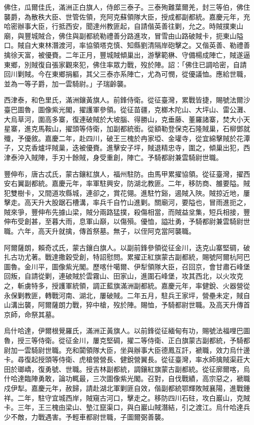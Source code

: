 \begin{pinyinscope}
佛住，瓜爾佳氏，滿洲正白旗人，侍郎三泰子。三泰殉難葉爾羌，封三等伯，佛住襲爵，為散秩大臣、世管佐領，充阿克蘇領隊大臣，授成都副都統。嘉慶元年，充哈密辦事大臣，行抵西安，聞達州教匪起，自請偕英善往剿，允之。時賊撲東山廟，與豐城賊合，佛住與副都統勒禮善分路進攻，冒雪由山路破賊卡，扼東山隘口。賊自大東林潛渡河，率協領塔克慎、知縣劉清隔岸砲擊之。又偕英善、勒禮善擒徐天富，被優賚。二年正月，豐城賊傾巢出，游擊範楙、守備楊成陣亡，賊遂逼東鄉，別賊復自張家觀來犯，佛住率眾力戰，歿於陣。詔：「佛住已調哈密，自請回川剿賊。今在東鄉捐軀，其父三泰亦系陣亡，尤為可憫，從優議恤。應給世職，並為一等子爵，加一雲騎尉。」子瑞齡襲。

西津泰，和色里氏，滿洲鑲黃旗人。前鋒侍衛。從征臺灣，累戰皆捷，賜號法爾沙臺巴圖魯，圖像紫光閣，擢護軍參領。從征苗疆，克榔木陀山、大坪山、雷公灘、大烏草河，圍高多寨，復連破賊於大坡腦、得勝山，克垂藤、董羅諸寨，焚大小天星寨，進克馬鞍山，擢頭等侍衛，加副都統銜。從額勒登保克石隆賊巢，石柳鄧就殲，予優敘。嘉慶二年，赴四川，破王三槐於冉家埡、金瓘寺，從宜綿擊賊於花潭子，又克香爐坪賊巢，迭被優賚。進擊安子坪，賊退精忠寺，圍之，傾巢出犯，西津泰沖入賊陣，手刃十餘賊，身受重創，陣亡。予騎都尉兼雲騎尉世職。

豐伸布，唐古忒氏，蒙古鑲紅旗人，福州駐防。由馬甲累擢協領。從征臺灣，擢西安右翼副都統。嘉慶元年，率軍駐興安，防湖北教匪。二年，移防商、雒要隘。賊犯雙樹卡，又間道攻縣城，連卻之，賞花翎。進駐竹谿，遏賊入陜。賊掠近地，屢擊走。高天升大股踞石槽溝，率兵千自竹山進剿。關廟河，要隘也，冒雨進扼之，賊來爭，豐伸布先據山梁，賊分兩路猛撲，殺傷相當，而賊益坌集，短兵相接，豐伸布受創甚，至暮大雨，息軍山巔，以傷殞。優恤，謚壯勇，予騎都尉兼雲騎尉世職。六年，高天升就擒，傳首祭墓。無子，以侄阿克當阿襲職。

阿爾薩朗，賴奇忒氏，蒙古鑲白旗人。以副前鋒參領從征金川，迭克山寨堅碉，破扎古功尤著。戰達撒穀受創，特詔慰問。累擢正紅旗蒙古副都統，賜號阿爾杭阿巴圖魯。金川平，圖像紫光閣。歷喀什噶爾、伊犁領隊大臣，召回京，會甘肅石峰堡回叛，自請從剿，連破賊於雲霧山、田家山，進圍石峰堡，攻其西北，以火攻克之，斬虜特多，授護軍統領，調正藍旗滿洲副都統。嘉慶元年，率健銳、火器營從永保剿教匪，轉戰河南、湖北，屢破賊。二年五月，駐兵王家坪，營壘未定，賊自山溝出襲，阿爾薩朗力戰，猝中槍，歿於陣。賜恤，予騎都尉世職。及高天升傳首京師，命祭其墓。

烏什哈達，伊爾根覺羅氏，滿洲正黃旗人。以前鋒從征緬甸有功，賜號法福哩巴圖魯，授三等侍衛。從征金川，屢克堅碉，擢二等侍衛、正白旗蒙古副都統，予騎都尉加一雲騎尉世職。充和闐領隊大臣，坐與辦事大臣德鳳互訐，褫職，效力烏什邊卡。尋復起授頭等侍衛、虎槍營營長、健銳營翼長。從征臺灣，率水師擒賊渠莊大田於瑯嶠，復勇號、世職。授吉林副都統，調鑲紅旗蒙古副都統。從征廓爾喀，烏什哈達臨陣勇敢，論功輒最，三次圖像紫光閣。召對，自伐戰績，高宗惡之，褫職戍伊犁。嘉慶元年，赦歸，請赴湖北軍剿匪自效，偕副都統鄂輝敗賊襄陽，進戰鍾祥。二年，駐守宜城西岸，賊窺古河口，擊走之。移防四川石砫，攻白巖山，克賊卡。三年，王三槐由梁山、墊江竄渠口，與白巖山賊潛結，引之渡江。烏什哈達兵少不敵，力戰遇害。予輕車都尉世職，子圖爾弼善襲。


\end{pinyinscope}
